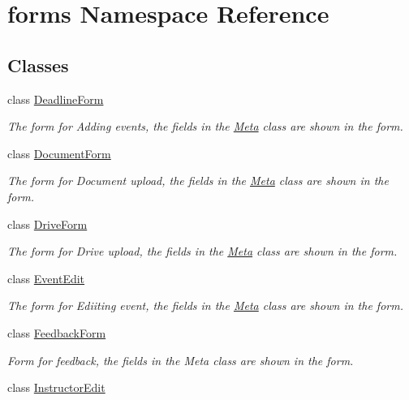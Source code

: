 \hypertarget{namespaceforms}{}\section{forms Namespace Reference}
\label{namespaceforms}
\subsection*{Classes}
\begin{DoxyCompactItemize}
\item 
class \hyperlink{classforms_1_1_deadline_form}{Deadline\+Form}
\begin{DoxyCompactList}\small\item\em The form for Adding events, the fields in the \hyperlink{classforms_1_1_deadline_form_1_1_meta}{Meta} class are shown in the form. \end{DoxyCompactList}\item 
class \hyperlink{classforms_1_1_document_form}{Document\+Form}
\begin{DoxyCompactList}\small\item\em The form for Document upload, the fields in the \hyperlink{classforms_1_1_document_form_1_1_meta}{Meta} class are shown in the form. \end{DoxyCompactList}\item 
class \hyperlink{classforms_1_1_drive_form}{Drive\+Form}
\begin{DoxyCompactList}\small\item\em The form for Drive upload, the fields in the \hyperlink{classforms_1_1_drive_form_1_1_meta}{Meta} class are shown in the form. \end{DoxyCompactList}\item 
class \hyperlink{classforms_1_1_event_edit}{Event\+Edit}
\begin{DoxyCompactList}\small\item\em The form for Ediiting event, the fields in the \hyperlink{classforms_1_1_event_edit_1_1_meta}{Meta} class are shown in the form. \end{DoxyCompactList}\item 
class \hyperlink{classforms_1_1_feedback_form}{Feedback\+Form}
\begin{DoxyCompactList}\small\item\em Form for feedback, the fields in the Meta class are shown in the form. \end{DoxyCompactList}\item 
class \hyperlink{classforms_1_1_instructor_edit}{Instructor\+Edit}

\end{DoxyCompactItemize}
